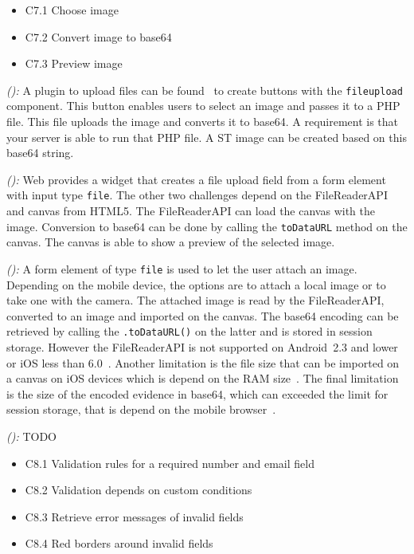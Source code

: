 \documentclass[a4paper]{artikel3}
\newcommand{\code}[1]{\texttt{#1}}
\newcommand{\setspace}[0]{\vspace{2mm}}
\renewcommand{\paragraph}[1]{\setspace \noindent {\bf #1}  }
\newcommand{\framework}[2]{ \emph{#1 (\textbf{#2}): }} %
\newcommand{\challenge}[1]{\paragraph{#1}}
\begin{document}
\challenge{\chal{afbeelding}}
\begin{itemize}
  \item C7.1 Choose image
  \item C7.2 Convert image to base64
  \item C7.3 Preview image
\end{itemize}

\framework{\sta{}}{}
A plugin to upload files can be found~\cite{Smirnov2012} to create buttons with the \code{fileupload} component.  
This button enables users to select an image and passes it to a PHP file.  
This file uploads the image and converts it to base64.
A requirement is that your server is able to run that PHP file.    
A ST image can be created based on this base64 string.

\framework{\kendoa{}}{}
\kendo{} Web provides a widget that creates a file upload field from a form element with input type \code{file}.
The other two challenges depend on the FileReaderAPI and canvas from HTML5.
The FileReaderAPI can load the canvas with the image.
Conversion to base64 can be done by calling the \code{toDataURL} method on the canvas.
The canvas is able to show a preview of the selected image.

\framework{\jqma{}}{}
A form element of type \code{file} is used to let the user attach an image.
Depending on the mobile device, the options are to attach a local image or to take one with the camera.
The attached image is read by the FileReaderAPI, converted to an image and imported on the canvas.
The base64 encoding can be retrieved by calling the \code{.toDataURL()} on the latter and is stored in session storage.
However the FileReaderAPI is not supported on Android~2.3 and lower or iOS less than 6.0~\cite{Deveria2013a}.
Another limitation is the file size that can be imported on a canvas on iOS devices which is depend on the RAM size~\cite{Apple2012}.
The final limitation is the size of the encoded evidence in base64, which can exceeded the limit for session storage, that is depend on the mobile browser~\cite{Gonzalez2012}.

\framework{\lungoa{}}{}
TODO



\challenge{\chal{validatie}}
\begin{itemize}
 \item C8.1 Validation rules for a required number and email field 
 \item C8.2 Validation depends on custom conditions 
 \item C8.3 Retrieve error messages of invalid fields
 \item C8.4 Red borders around invalid fields 
\end{itemize}
\end{document}
